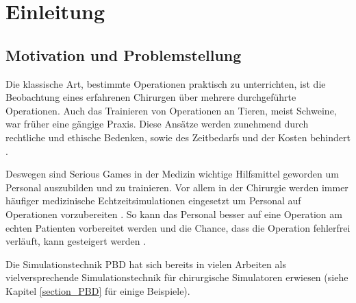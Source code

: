 \chapter{Einleitung}
\label{chap_Einleitung}

\section{Motivation und Problemstellung} %


Die klassische Art, bestimmte Operationen praktisch zu unterrichten, ist die Beobachtung eines erfahrenen Chirurgen über mehrere durchgeführte Operationen. Auch das Trainieren von Operationen an Tieren, meist Schweine, war früher eine gängige Praxis. Diese Ansätze werden zunehmend durch rechtliche und ethische Bedenken, sowie des Zeitbedarfs und der Kosten behindert \cite{SurgSim}.

Deswegen sind Serious Games in der Medizin wichtige Hilfsmittel geworden um Personal auszubilden und zu trainieren. Vor allem in der Chirurgie werden immer häufiger medizinische Echtzeitsimulationen eingesetzt um Personal auf Operationen vorzubereiten \cite{SimRole}. So kann das Personal besser auf eine Operation am echten Patienten vorbereitet werden und die Chance, dass die Operation fehlerfrei verläuft, kann gesteigert werden \cite{VRNeuro}.

Die Simulationstechnik \ac{PBD} \cite{PBD} hat sich bereits in vielen Arbeiten als vielversprechende Simulationstechnik für chirurgische Simulatoren erwiesen (siehe Kapitel \ref{section_PBD} für einige Beispiele). 


